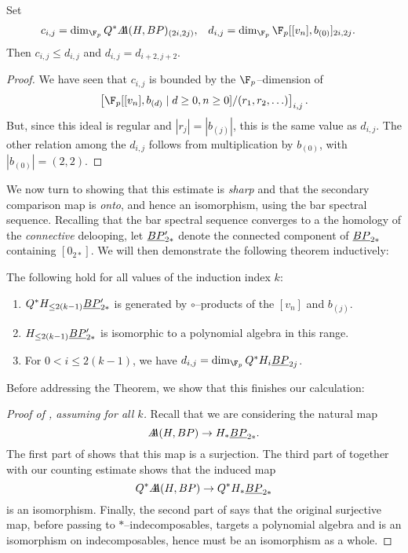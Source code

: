 \begin{corollary}
Set
\begin{align*}
c_{i,j} & = \dim_{\F_p} Q^* \AA(H, BP)_{(2i, 2j)}, &
d_{i,j} & = \dim_{\F_p} \F_p[[v_n], b_{(0)}]_{2i,2j}.
\end{align*}
Then $c_{i,j} \le d_{i,j}$ and $d_{i,j} = d_{i+2,j+2}$.
\end{corollary}
\begin{proof}
We have seen that $c_{i,j}$ is bounded by the $\F_p$--dimension of \[\left[\F_p[[v_n], b_{(d)} \mid d \ge 0, n \ge 0] / (r_1, r_2, \ldots)\right]_{i,j}.\]  But, since this ideal is regular and $|r_j| = |b_{(j)}|$, this is the same value as $d_{i,j}$.  The other relation among the $d_{i,j}$ follows from multiplication by $b_{(0)}$, with $|b_{(0)}| = (2, 2)$.
\end{proof}

We now turn to showing that this estimate is \emph{sharp} and that the secondary comparison map is \emph{onto}, and hence an isomorphism, using the bar spectral sequence.  Recalling that the bar spectral sequence converges to a the homology of the \emph{connective} delooping, let $\underline{\smash{BP}}_{2*}'$ denote the connected component of $\underline{\smash{BP}}_{2*}$ containing $[0_{2*}]$.  We will then demonstrate the following theorem inductively:
\begin{theorem}\label{HFpBPCooperationsInduction}
The following hold for all values of the induction index $k$:
\begin{enumerate}
\item $Q^* H_{\le 2(k-1)} \underline{\smash{BP}}_{2*}'$ is generated by $\circ$--products of the $[v_n]$ and $b_{(j)}$.
\item $H_{\le 2(k-1)} \underline{\smash{BP}}_{2*}'$ is isomorphic to a polynomial algebra in this range.
\item For $0 < i \le 2(k-1)$, we have $d_{i,j} = \dim_{\F_p} Q^* H_i \OS{BP}{2j}$.
\end{enumerate}
\end{theorem}

\noindent Before addressing the Theorem, we show that this finishes our calculation:
\begin{proof}[{Proof of , assuming  for all $k$}]
Recall that we are considering the natural map \[A\!\!\!A(H, BP) \to H_* \underline{\smash{BP}}_{2*}.\]  The first part of  shows that this map is a surjection.  The third part of  together with our counting estimate shows that the induced map \[Q^* A\!\!\!A(H, BP) \to Q^* H_* \underline{\smash{BP}}_{2*}\] is an isomorphism.  Finally, the second part of  says that the original surjective map, before passing to $\ast$--indecomposables, targets a polynomial algebra and is an isomorphism on indecomposables, hence must be an isomorphism as a whole.
\end{proof}

